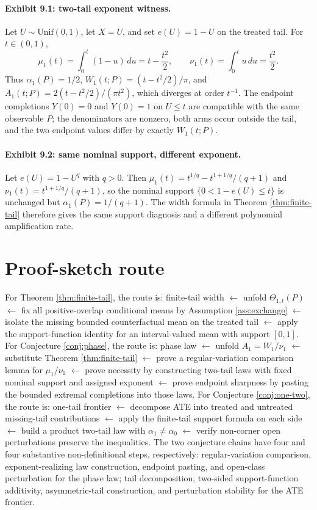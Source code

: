 \documentclass[11pt]{article}
\theoremstyle{definition}
\theoremstyle{plain}
\theoremstyle{remark}
\begin{document}
\paragraph{Exhibit 9.1: two-tail exponent witness.}
Let \(U\sim \mathrm{Unif}(0,1)\), let \(X=U\), and set \(e(U)=1-U\) on the treated tail.  For \(t\in(0,1)\),
\[
\mu_1(t)=\int_0^t(1-u)\,du=t-\frac{t^2}{2},\qquad
\nu_1(t)=\int_0^t u\,du=\frac{t^2}{2}.
\]
Thus \(\alpha_1(P)=1/2\), \(W_1(t;P)=(t-t^2/2)/\pi\), and \(A_1(t;P)=2(t-t^2/2)/(\pi t^2)\), which diverges at order \(t^{-1}\).  The endpoint completions \(Y(0)=0\) and \(Y(0)=1\) on \(U\le t\) are compatible with the same observable \(P\); the denominators are nonzero, both arms occur outside the tail, and the two endpoint values differ by exactly \(W_1(t;P)\).

\paragraph{Exhibit 9.2: same nominal support, different exponent.}
Let \(e(U)=1-U^q\) with \(q>0\).  Then \(\mu_1(t)=t^{1/q}-t^{1+1/q}/(q+1)\) and \(\nu_1(t)=t^{1+1/q}/(q+1)\), so the nominal support \(\{0<1-e(U)\le t\}\) is unchanged but \(\alpha_1(P)=1/(q+1)\).  The width formula in Theorem \ref{thm:finite-tail} therefore gives the same support diagnosis and a different polynomial amplification rate.

\section{Proof-sketch route}
For Theorem \ref{thm:finite-tail}, the route is: finite-tail width \(\leftarrow\) unfold \(\Theta_{1,t}(P)\) \(\leftarrow\) fix all positive-overlap conditional means by Assumption \ref{ass:exchange} \(\leftarrow\) isolate the missing bounded counterfactual mean on the treated tail \(\leftarrow\) apply the support-function identity for an interval-valued mean with support \([0,1]\).  For Conjecture \ref{conj:phase}, the route is: phase law \(\leftarrow\) unfold \(A_1=W_1/\nu_1\) \(\leftarrow\) substitute Theorem \ref{thm:finite-tail} \(\leftarrow\) prove a regular-variation comparison lemma for \(\mu_1/\nu_1\) \(\leftarrow\) prove necessity by constructing two-tail laws with fixed nominal support and assigned exponent \(\leftarrow\) prove endpoint sharpness by pasting the bounded extremal completions into those laws.  For Conjecture \ref{conj:one-two}, the route is: one-tail frontier \(\leftarrow\) decompose ATE into treated and untreated missing-tail contributions \(\leftarrow\) apply the finite-tail support formula on each side \(\leftarrow\) build a product two-tail law with \(\alpha_1\ne\alpha_0\) \(\leftarrow\) verify non-corner open perturbations preserve the inequalities.  The two conjecture chains have four and four substantive non-definitional steps, respectively: regular-variation comparison, exponent-realizing law construction, endpoint pasting, and open-class perturbation for the phase law; tail decomposition, two-sided support-function additivity, asymmetric-tail construction, and perturbation stability for the ATE frontier.
\end{document}
